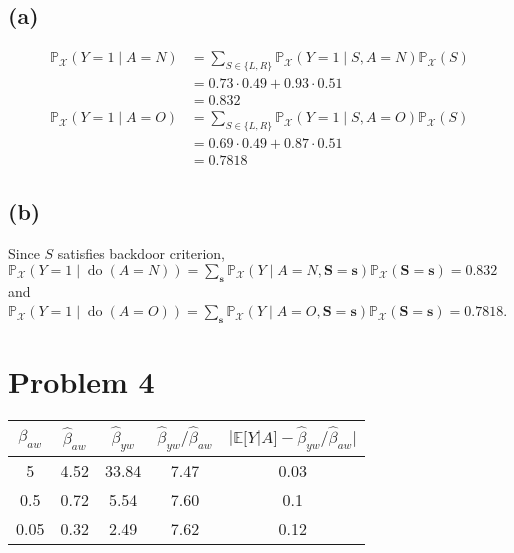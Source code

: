 \documentclass[10pt]{article}
\begin{document}
\subsection{(a)}
\begin{align*}
    \mathbb{P}_{\mathcal{X}}(Y=1 \mid A=N) &= \sum_{S \in \{L, R\}}\mathbb{P}_{\mathcal{X}}(Y=1 \mid S, A=N) \mathbb{P}_{\mathcal{X}}(S)\\   
    &= 0.73 \cdot 0.49 + 0.93 \cdot  0.51 \\
    &= 0.832\\
    \mathbb{P}_{\mathcal{X}}(Y=1 \mid A=O) &= \sum_{S \in \{L, R\}}\mathbb{P}_{\mathcal{X}}(Y=1 \mid S, A=O) \mathbb{P}_{\mathcal{X}}(S)\\   
    &= 0.69 \cdot 0.49 + 0.87 \cdot  0.51 \\
    &= 0.7818
\end{align*}

\subsection{(b)}
Since $S$ satisfies backdoor criterion, 
$\mathbb{P}_{\mathcal{X}}(Y=1 \mid \operatorname{do}(A=N)) = \sum_{\mathbf{s}} \mathbb{P}_{\mathcal{X}}(Y \mid A=N, \mathbf{S}=\mathbf{s}) \mathbb{P}_{\mathcal{X}}(\mathbf{S}=\mathbf{s})=0.832$ and 
$\mathbb{P}_{\mathcal{X}}(Y=1 \mid \operatorname{do}(A=O)) = \sum_{\mathbf{s}} \mathbb{P}_{\mathcal{X}}(Y \mid A=O, \mathbf{S}=\mathbf{s}) \mathbb{P}_{\mathcal{X}}(\mathbf{S}=\mathbf{s})=0.7818$.

\section{Problem 4}

\begin{center}
    \begin{tabular}{||c c c c c||} 
     \hline
     $\beta_{aw}$ & $\hat{\beta}_{aw}$ & $\hat{\beta}_{yw}$ & $\widehat{\beta}_{y w} / \widehat{\beta}_{a w}$ & $|\mathbb{E}[Y|A] - \widehat{\beta}_{y w} / \widehat{\beta}_{a w}|$ \\ [0.5ex] 
     \hline\hline
     5 & 4.52 & 33.84 & 7.47 & 0.03\\ 
     \hline
     0.5 & 0.72 & 5.54 & 7.60 & 0.1\\
     \hline
     0.05 & 0.32 & 2.49 & 7.62 & 0.12\\
     \hline
    \end{tabular}
\end{center}
\end{document}
